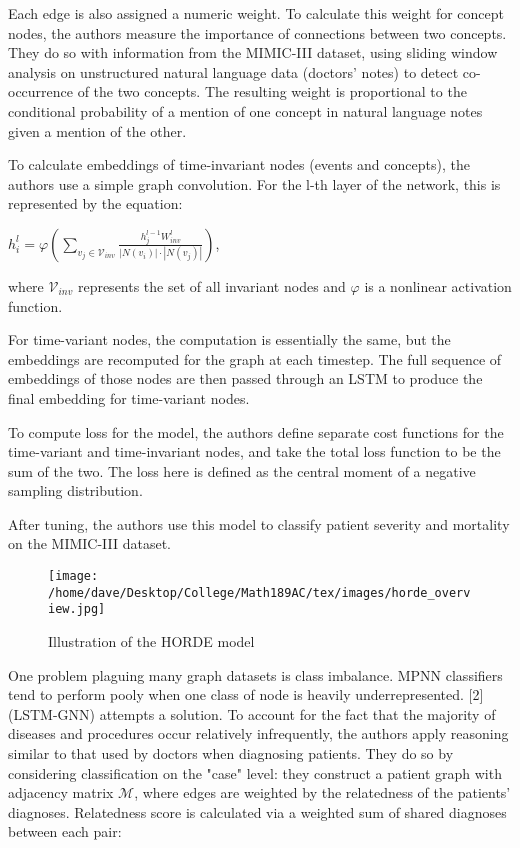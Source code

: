 \documentclass{article}
\begin{document}
Each edge is also assigned a numeric weight. To calculate this weight for concept nodes, the authors measure the importance of connections between two concepts. They do so with information from the MIMIC-III dataset, using sliding window analysis on unstructured natural language data (doctors' notes) to detect co-occurrence of the two concepts. The resulting weight is proportional to the conditional probability of a mention of one concept in natural language notes given a mention of the other. 

To calculate embeddings of time-invariant nodes (events and concepts), the authors use a simple graph convolution. For the l-th layer of the network, this is represented by the equation:

\begin{center}
$h_i^l = \varphi(\sum\limits_{v_j \in \mathcal{V}_{inv}} \frac{h_j^{l-1}W^l_{inv}}{|N(v_i)|\cdot |N(v_j)|})$,
\end{center}

where $\mathcal{V}_{inv}$ represents the set of all invariant nodes and $\varphi$ is a nonlinear activation function.

For time-variant nodes, the computation is essentially the same, but the embeddings are recomputed for the graph at each timestep. The full sequence of embeddings of those nodes are then passed through an LSTM to produce the final embedding for time-variant nodes. 

To compute loss for the model, the authors define separate cost functions for the time-variant and time-invariant nodes, and take the total loss function to be the sum of the two. The loss here is defined as the central moment of a negative sampling distribution.

After tuning, the authors use this model to classify patient severity and mortality on the MIMIC-III dataset.


\begin{figure} [htb]
\centering
	\caption{Illustration of the HORDE model}
        \texttt{[image: /home/dave/Desktop/College/Math189AC/tex/images/horde\_overview.jpg]}
\end{figure}
    
One problem plaguing many graph datasets is class imbalance. MPNN classifiers tend to perform pooly when one class of node is heavily underrepresented. 
[2] (LSTM-GNN) attempts a solution. To account for the fact that the majority of diseases and procedures occur relatively infrequently, the authors apply reasoning similar to that used by doctors when diagnosing patients. They do so by considering classification on the "case" level: they construct a patient graph with adjacency matrix $\mathcal{M}$, where edges are weighted by the relatedness of the patients' diagnoses. Relatedness score is calculated via a weighted sum of shared diagnoses between each pair:
\end{document}
